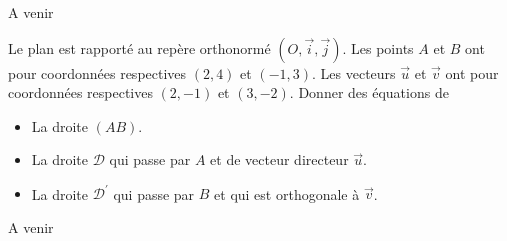 \documentclass[a4paper, 11pt]{article}
\begin{document}
\begin{correction}
	A venir
\end{correction}





\begin{exercice}
	Le plan est rapport\'e au rep\`ere orthonorm\'e $(O,\vec{i},\vec{j})$. Les points  $A$ et $B$ ont pour coordonn\'ees respectives $(2,4)$ et $(-1,3)$. Les vecteurs $\vec{u}$ et $\vec{v}$ ont pour coordonn\'ees respectives $(2,-1)$ et $(3,-2)$. Donner des \'equations de
	\begin{itemize}
		\item La droite $(AB)$.
		\item La droite $\mathcal{D}$  qui passe par $A$ et de vecteur directeur $\vec{u}$.
		\item La droite  $\mathcal{D}^{\prime}$  qui passe par $B$ et qui est orthogonale \`a $\vec{v}$.
	\end{itemize}

\end{exercice}

\begin{correction}
	A venir
\end{correction}
\end{document}
